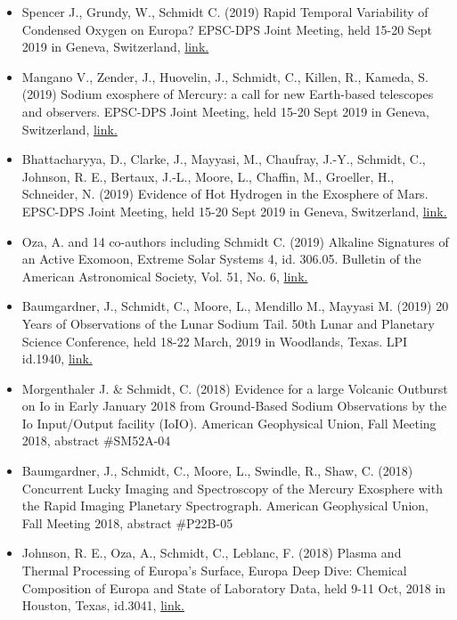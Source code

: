 \documentclass[12pt]{report}
\begin{document}
\begin{itemize}
   \item Spencer J., Grundy, W., Schmidt C. (2019) Rapid Temporal Variability of Condensed Oxygen on Europa? EPSC-DPS Joint Meeting, held 15-20 Sept 2019 in Geneva, Switzerland, \href{https://meetingorganizer.copernicus.org/EPSC-DPS2019/EPSC-DPS2019-935-1.pdf}{link.}
   \item Mangano V., Zender, J., Huovelin, J., Schmidt, C., Killen, R., Kameda, S. (2019) Sodium exosphere of Mercury: a call for new Earth-based telescopes and observers. EPSC-DPS Joint Meeting, held 15-20 Sept 2019 in Geneva, Switzerland, \href{https://meetingorganizer.copernicus.org/EPSC-DPS2019/EPSC-DPS2019-1967-2.pdf}{link.}
   \item Bhattacharyya, D., Clarke, J., Mayyasi, M., Chaufray, J.-Y., Schmidt, C., Johnson, R. E., Bertaux, J.-L., Moore, L., Chaffin, M., Groeller, H., Schneider, N. (2019) Evidence of Hot Hydrogen in the Exosphere of Mars. EPSC-DPS Joint Meeting, held 15-20 Sept 2019 in Geneva, Switzerland, \href{https://meetingorganizer.copernicus.org/EPSC-DPS2019/EPSC-DPS2019-960-1.pdf}{link.}
   \item Oza, A. and 14 co-authors including Schmidt C. (2019) Alkaline Signatures of an Active Exomoon, Extreme Solar Systems 4, id. 306.05. Bulletin of the American Astronomical Society, Vol. 51, No. 6, \href{https://113qx216in8z1kdeyi404hgf-wpengine.netdna-ssl.com/wp-content/uploads/2019/09/exss4_abstracts.pdf#abs306.05}{link.}
   \item Baumgardner, J., Schmidt, C., Moore, L., Mendillo M., Mayyasi M. (2019) 20 Years of Observations of the Lunar Sodium Tail. 50th Lunar and Planetary Science Conference, held 18-22 March, 2019 in Woodlands, Texas. LPI id.1940, \href{https://www.hou.usra.edu/meetings/lpsc2019/pdf/1940.pdf}{link.}
   \item Morgenthaler J. \& Schmidt, C. (2018) Evidence for a large Volcanic Outburst on Io in Early January 2018 from Ground-Based Sodium Observations by the Io Input/Output facility (IoIO). American Geophysical Union, Fall Meeting 2018, abstract \#SM52A-04
   \item Baumgardner, J., Schmidt, C., Moore, L., Swindle, R., Shaw, C. (2018) Concurrent Lucky Imaging and Spectroscopy of the Mercury Exosphere with the Rapid Imaging Planetary Spectrograph. American Geophysical Union, Fall Meeting 2018, abstract \#P22B-05
   \item Johnson, R. E., Oza, A., Schmidt, C., Leblanc, F. (2018) Plasma and Thermal Processing of Europa's Surface, Europa Deep Dive: Chemical Composition of Europa and State of Laboratory Data, held 9-11 Oct, 2018 in Houston, Texas, id.3041, \href{https://www.hou.usra.edu/meetings/europadeepdive2018/pdf/3041.pdf}{link.} 

\end{itemize}
\end{document}
